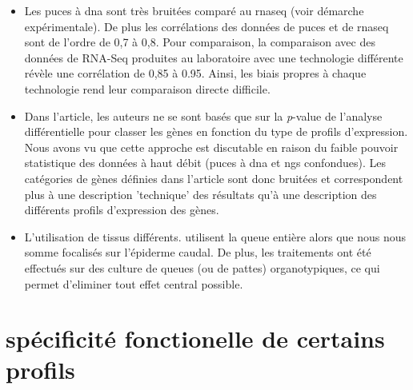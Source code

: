 \documentclass[../main.tex]{subfiles}
\begin{document}
\begin{itemize}
\item Les puces à \gls{dna} sont très bruitées comparé au \gls{rnaseq} (voir démarche expérimentale).
De plus les corrélations des données de puces et de \gls{rnaseq} sont de l'ordre de 0,7 à 0,8.
Pour comparaison, la comparaison avec des données de RNA-Seq produites au laboratoire avec une technologie différente révèle une corrélation de 0,85 à 0.95.
Ainsi, les biais propres à chaque technologie rend leur comparaison directe difficile.
\item Dans l'article, les auteurs ne se sont basés que sur la \textit{p}-value de l'analyse différentielle pour classer les gènes en fonction du type de profils d'expression.
Nous avons vu que cette approche est discutable en raison du faible pouvoir statistique des données à haut débit (puces à \gls{dna} et \gls{ngs} confondues).
Les catégories de gènes définies dans l'article sont donc bruitées et correspondent plus à une description 'technique' des résultats qu'à une description des différents profils d'expression des gènes.
\item L'utilisation de tissus différents.
\citep{Kulkarni2011} utilisent la queue entière alors que nous nous somme focalisés sur l'épiderme caudal.
De plus, les traitements ont été effectués sur des culture de queues (ou de pattes) organotypiques, ce qui permet d'eliminer tout effet central possible.
\end{itemize}




\section{spécificité fonctionelle de certains profils}
\end{document}
